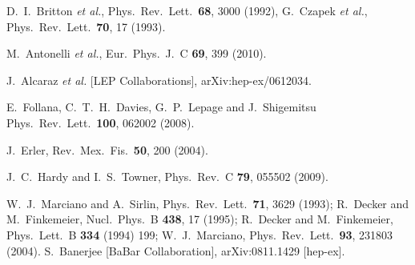 \documentclass[fleqn,twoside]{article}
\begin{document}
\begin{thebibliography}{99}
  D.~I.~Britton {\it et al.},
  Phys.\ Rev.\ Lett.\  {\bf 68}, 3000 (1992),
%
  G.~Czapek {\it et al.},
  Phys.\ Rev.\ Lett.\  {\bf 70}, 17 (1993).

  M.~Antonelli {\it et al.},
  Eur.\ Phys.\ J.\  C {\bf 69}, 399 (2010).

  J.~Alcaraz {\it et al.}  [LEP Collaborations],
  arXiv:hep-ex/0612034.

  E.~Follana, C.~T.~H.~Davies, G.~P.~Lepage and J.~Shigemitsu
  Phys.\ Rev.\ Lett.\  {\bf 100}, 062002 (2008).

  J.~Erler,
  Rev.\ Mex.\ Fis.\  {\bf 50}, 200 (2004).

  J.~C.~Hardy and I.~S.~Towner,
  Phys.\ Rev.\  C {\bf 79}, 055502 (2009).

  W.~J.~Marciano and A.~Sirlin,
  Phys.\ Rev.\ Lett.\  {\bf 71}, 3629 (1993);
%
  R.~Decker and M.~Finkemeier,
  Nucl.\ Phys.\  B {\bf 438}, 17 (1995);
%
  R.~Decker and M.~Finkemeier,
  Phys.\ Lett.\  B {\bf 334} (1994) 199;
%
  W.~J.~Marciano,
  Phys.\ Rev.\ Lett.\  {\bf 93}, 231803 (2004).
S.~Banerjee  [BaBar Collaboration],
 arXiv:0811.1429 [hep-ex].


\end{thebibliography}
\end{document}
